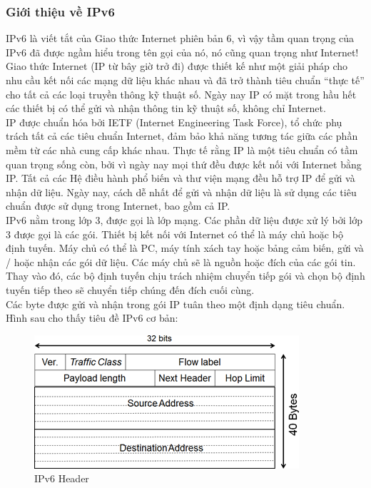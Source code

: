 \documentclass{report}
\begin{document}
\subsubsection{Giới thiệu về IPv6}
IPv6 là viết tắt của Giao thức Internet phiên bản 6, vì vậy tầm quan trọng của IPv6 đã được ngầm hiểu trong tên gọi của nó, nó cũng quan trọng như Internet! Giao thức Internet (IP từ bây giờ trở đi) được thiết kế như một giải pháp cho nhu cầu kết nối các mạng dữ liệu khác nhau và đã trở thành tiêu chuẩn “thực tế” cho tất cả các loại truyền thông kỹ thuật số. Ngày nay IP có mặt trong hầu hết các thiết bị có thể gửi và nhận thông tin kỹ thuật số, không chỉ Internet. \\

IP được chuẩn hóa bởi IETF (Internet Engineering Task Force), tổ chức phụ trách tất cả các tiêu chuẩn Internet, đảm bảo khả năng tương tác giữa các phần mềm từ các nhà cung cấp khác nhau. Thực tế rằng IP là một tiêu chuẩn có tầm quan trọng sống còn, bởi vì ngày nay mọi thứ đều được kết nối với Internet bằng IP. Tất cả các Hệ điều hành phổ biến và thư viện mạng đều hỗ trợ IP để gửi và nhận dữ liệu. Ngày nay, cách dễ nhất để gửi và nhận dữ liệu là sử dụng các tiêu chuẩn được sử dụng trong Internet, bao gồm cả IP. \\

IPv6 nằm trong lớp 3, được gọi là lớp mạng. Các phần dữ liệu được xử lý bởi lớp 3 được gọi là các gói. Thiết bị kết nối với Internet có thể là máy chủ hoặc bộ định tuyến. Máy chủ có thể là PC, máy tính xách tay hoặc bảng cảm biến, gửi và / hoặc nhận các gói dữ liệu. Các máy chủ sẽ là nguồn hoặc đích của các gói tin. Thay vào đó, các bộ định tuyến chịu trách nhiệm chuyển tiếp gói và chọn bộ định tuyến tiếp theo sẽ chuyển tiếp chúng đến đích cuối cùng. \\

Các byte được gửi và nhận trong gói IP tuân theo một định dạng tiêu chuẩn. Hình sau cho thấy tiêu đề IPv6 cơ bản:
\newpage
\begin{figure}[h]
	\centering
	\includegraphics[scale = 0.7]{fig21.png}
	\caption{IPv6 Header}
	\label{fig:Graph21}
\end{figure}
\end{document}
